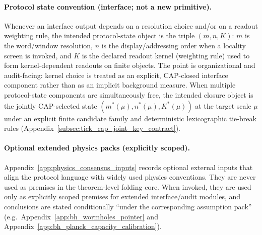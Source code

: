 \paragraph{Protocol state convention (interface; not a new primitive).}
\InterfaceTag Whenever an interface output depends on a resolution choice and/or on a readout weighting rule, the intended protocol-state object is the triple $(m,n,K)$:
$m$ is the word/window resolution, $n$ is the display/addressing order when a locality screen is invoked, and $K$ is the declared readout kernel (weighting rule) used to form kernel-dependent readouts on finite objects.
\AuditTag The point is organizational and audit-facing: kernel choice is treated as an explicit, CAP-closed interface component rather than as an implicit background measure.
\AuditTag When multiple protocol-state components are simultaneously free, the intended closure object is the jointly CAP-selected state $(m^\ast(\mu),n^\ast(\mu),K^\ast(\mu))$ at the target scale $\mu$ under an explicit finite candidate family and deterministic lexicographic tie-break rules (Appendix~\ref{subsec:tick_cap_joint_key_contract}).

\paragraph{Optional extended physics packs (explicitly scoped).}
\AuditTag Appendix~\ref{app:physics_consensus_inputs} records optional external inputs that align the protocol language with widely used physics conventions.
They are never used as premises in the theorem-level folding core.
When invoked, they are used only as explicitly scoped premises for extended interface/audit modules, and conclusions are stated conditionally ``under the corresponding assumption pack'' (e.g.\ Appendix~\ref{app:bh_wormholes_pointer} and Appendix~\ref{app:bh_planck_capacity_calibration}).

